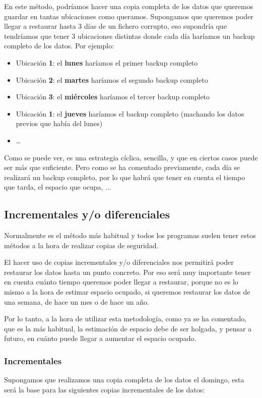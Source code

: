 En este método, podríamos hacer una copia completa de los datos que queremos guardar en tantas ubicaciones como queramos. Supongamos que queremos poder llegar a restaurar hasta 3 días de un fichero corrupto, eso supondría que tendríamos que tener 3 ubicaciones distintas donde cada día haríamos un backup completo de los datos. Por ejemplo:

\begin{itemize}
    \item Ubicación \textbf{1}: el \textbf{lunes} haríamos el primer backup completo
    \item Ubicación \textbf{2}: el \textbf{martes} haríamos el segundo backup completo
    \item Ubicación \textbf{3}: el \textbf{miércoles} haríamos el tercer backup completo
    \item Ubicación \textbf{1}: el \textbf{jueves} haríamos el backup completo (machando los datos previos que había del lunes)
    \item …
\end{itemize}

Como se puede ver, es una estrategia cíclica, sencilla, y que en ciertos casos puede ser más que suficiente. Pero como se ha comentado previamente, cada día se realizará un backup completo, por lo que habrá que tener en cuenta el tiempo que tarda, el espacio que ocupa, ...


\subsection{Incrementales y/o diferenciales}
Normalmente es el método más habitual y todos los programas suelen tener estos métodos a la hora de realizar copias de seguridad.

El hacer uso de copias incrementales y/o diferenciales nos permitirá poder restaurar los datos hasta un punto concreto. Por eso será muy importante tener en cuenta cuánto tiempo queremos poder llegar a restaurar, porque no es lo mismo a la hora de estimar espacio ocupado, si queremos restaurar los datos de una semana, de hace un mes o de hace un año.

Por lo tanto, a la hora de utilizar esta metodología, como ya se ha comentado, que es la más habitual, la estimación de espacio debe de ser holgada, y pensar a futuro, en cuánto puede llegar a aumentar el espacio ocupado.

\subsubsection{Incrementales}
﻿Supongamos que realizamos una copia completa de los datos el domingo, esta será la base para las siguientes copias incrementales de los datos:

